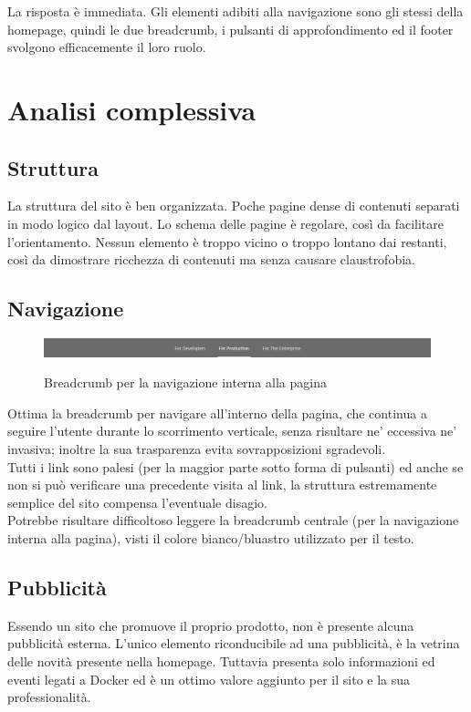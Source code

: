 \documentclass[a4paper]{article}
\begin{document}
\noindent La risposta è immediata. Gli elementi adibiti alla navigazione sono gli stessi della homepage, quindi le due breadcrumb, i pulsanti di approfondimento ed il footer svolgono efficacemente il loro ruolo.

\section{Analisi complessiva}

\subsection{Struttura}
La struttura del sito è ben organizzata. Poche pagine dense di contenuti separati in modo logico dal layout. Lo schema delle pagine è regolare, così da facilitare l'orientamento. Nessun elemento è troppo vicino o troppo lontano dai restanti, così da dimostrare ricchezza di contenuti ma senza causare claustrofobia.

\subsection{Navigazione}

\begin{figure}[H]
	\centering
	\includegraphics[width=\linewidth]{images/breadcrumbinterna.png}
    \label{fig:breadcrumbint}
    \caption{Breadcrumb per la navigazione interna alla pagina}
\end{figure}

\noindent Ottima la breadcrumb per navigare all'interno della pagina, che continua a seguire l'utente durante lo scorrimento verticale, senza risultare ne' eccessiva ne' invasiva; inoltre la sua trasparenza evita sovrapposizioni sgradevoli.
\\
Tutti i link sono palesi (per la maggior parte sotto forma di pulsanti) ed anche se non si può verificare una precedente visita al link, la struttura estremamente semplice del sito compensa l'eventuale disagio.
\\
Potrebbe risultare difficoltoso leggere la breadcrumb centrale (per la navigazione interna alla pagina), visti il colore bianco/bluastro utilizzato per il testo.

\subsection{Pubblicità}
Essendo un sito che promuove il proprio prodotto, non è presente alcuna pubblicità esterna. L'unico elemento riconducibile ad una pubblicità, è la vetrina delle novità presente nella homepage. Tuttavia presenta solo informazioni ed eventi legati a Docker ed è un ottimo valore aggiunto per il sito e la sua professionalità.
\end{document}
